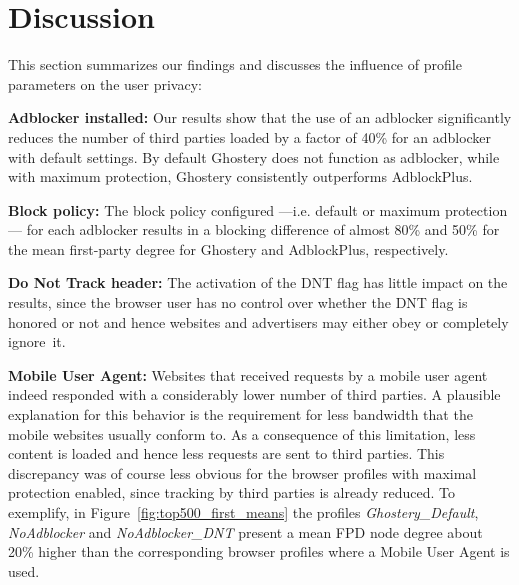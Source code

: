 \documentclass[compsoc, conference, letterpaper, 10pt, times]{IEEEtran}
\begin{document}
\section{Discussion}
This section summarizes our findings and discusses the influence of profile parameters on the user privacy:

\vspace{0.5 em}\noindent \textbf{Adblocker installed:} Our results show that the use of an adblocker significantly reduces the number of third parties loaded by a factor of 40\% for an adblocker with default settings. By default Ghostery does not function as adblocker, while with maximum protection, Ghostery consistently outperforms AdblockPlus.

\vspace{0.5 em}\noindent \textbf{Block policy:} The block policy configured ---i.e. default or maximum protection--- for each adblocker results in a blocking difference of almost 80\% and 50\% for the mean first-party degree for Ghostery and AdblockPlus, respectively.

\vspace{0.5 em}\noindent \textbf{Do Not Track header:} The activation of the DNT flag has little impact on the results, since the browser user has no control over whether the DNT flag is honored or not and hence websites and advertisers may either obey or completely ignore~it.

\vspace{0.5 em}\noindent \textbf{Mobile User Agent:} Websites that received requests by a mobile user agent indeed responded with a considerably lower number of third parties. A plausible explanation for this behavior is the requirement for less bandwidth that the mobile websites usually conform to. As a consequence of this limitation, less content is loaded and hence less requests are sent to third parties. This discrepancy was of course less obvious for the browser profiles with maximal protection enabled, since tracking by third parties is already reduced. To exemplify, in Figure~\ref{fig:top500_first_means} the profiles \textit{Ghostery\_Default}, \textit{NoAdblocker} and \textit{NoAdblocker\_DNT} present a mean FPD node degree about 20\% higher than the corresponding browser profiles where a Mobile User Agent is used.
\end{document}
